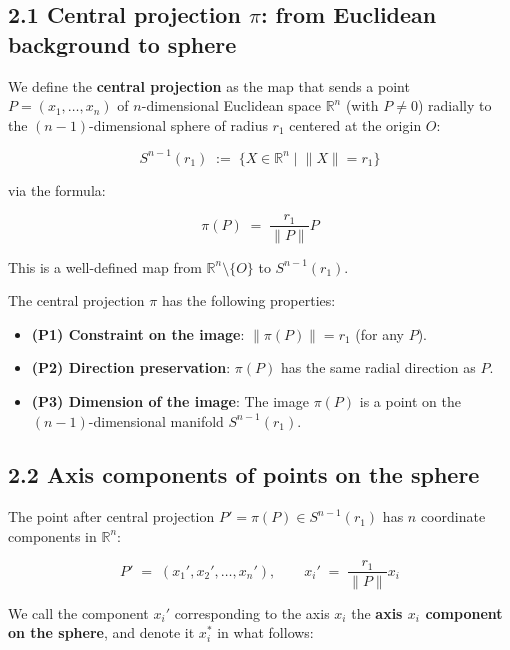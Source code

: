 \documentclass[a4paper,11pt]{article}
\theoremstyle{definition}
\theoremstyle{remark}
\providecommand{\tightlist}{%
  \setlength{\itemsep}{0pt}\setlength{\parskip}{0pt}}
\begin{document}
\subsection{\texorpdfstring{2.1 Central projection \(\pi\): from
Euclidean background to
sphere}{2.1 Central projection \textbackslash pi: from Euclidean background to sphere}}\label{central-projection-pi-from-euclidean-background-to-sphere}

We define the \textbf{central projection} as the map that sends a point
\(P = (x_1, \ldots, x_n)\) of \(n\)-dimensional Euclidean space
\(\mathbb{R}^n\) (with \(P \neq 0\)) radially to the
\((n-1)\)-dimensional sphere of radius \(r_1\) centered at the origin
\(O\):

\[
S^{n-1}(r_1) \;:=\; \bigl\{X \in \mathbb{R}^{n} \;\big|\; \lVert X\rVert = r_1\bigr\}
\]

via the formula:

\[
\pi(P) \;=\; \frac{r_1}{\lVert P\rVert} P
\]

This is a well-defined map from \(\mathbb{R}^n \setminus \{O\}\) to
\(S^{n-1}(r_1)\).

The central projection \(\pi\) has the following properties:

\begin{itemize}
\tightlist
\item
  \textbf{(P1) Constraint on the image}: \(\lVert \pi(P) \rVert = r_1\)
  (for any \(P\)).
\item
  \textbf{(P2) Direction preservation}: \(\pi(P)\) has the same radial
  direction as \(P\).
\item
  \textbf{(P3) Dimension of the image}: The image \(\pi(P)\) is a point
  on the \((n-1)\)-dimensional manifold \(S^{n-1}(r_1)\).
\end{itemize}

\subsection{2.2 Axis components of points on the
sphere}\label{axis-components-of-points-on-the-sphere}

The point after central projection \(P' = \pi(P) \in S^{n-1}(r_1)\) has
\(n\) coordinate components in \(\mathbb{R}^n\):

\[
P' \;=\; (x_1', x_2', \ldots, x_n'), \qquad x_i' \;=\; \frac{r_1}{\lVert P\rVert} x_i
\]

We call the component \(x_i'\) corresponding to the axis \(x_i\) the
\textbf{axis \(x_i\) component on the sphere}, and denote it \(x_i^*\)
in what follows:
\end{document}
